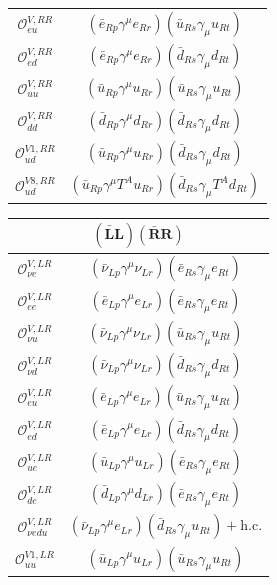 \begin{table}[htbp]
{\begin{tabular}[t]{c|c}
        $\mathcal{O}_{eu}^{V,RR}$ & $(\bar{e}_{Rp} \gamma^\mu e_{Rr})(\bar{u}_{Rs} \gamma_\mu u_{Rt})$ \\
        $\mathcal{O}_{ed}^{V,RR}$ & $(\bar{e}_{Rp} \gamma^\mu e_{Rr})(\bar{d}_{Rs} \gamma_\mu d_{Rt})$ \\
        $\mathcal{O}_{uu}^{V,RR}$ & $(\bar{u}_{Rp} \gamma^\mu u_{Rr})(\bar{u}_{Rs} \gamma_\mu u_{Rt})$ \\
        $\mathcal{O}_{dd}^{V,RR}$ & $(\bar{d}_{Rp} \gamma^\mu d_{Rr})(\bar{d}_{Rs} \gamma_\mu d_{Rt})$ \\
        $\mathcal{O}_{ud}^{V1,RR}$ & $(\bar{u}_{Rp} \gamma^\mu u_{Rr})(\bar{d}_{Rs} \gamma_\mu d_{Rt})$ \\
        $\mathcal{O}_{ud}^{V8,RR}$ & $(\bar{u}_{Rp} \gamma^\mu T^A u_{Rr})(\bar{d}_{Rs} \gamma_\mu T^A d_{Rt})$
    \end{tabular}
    \hspace{0.3em}
    \begin{tabular}[t]{c|c}
        \multicolumn{2}{c}{\textbf{$\boldsymbol{(\bar{L}L)(\bar{R}R)}$}} \\ \hline
        \cellcolor{gray!25}$\mathcal{O}_{\nu e}^{V,LR}$ & \cellcolor{gray!25}$(\bar{\nu}_{Lp} \gamma^\mu \nu_{Lr})(\bar{e}_{Rs} \gamma_\mu e_{Rt})$ \\
        $\mathcal{O}_{ee}^{V,LR}$ & $(\bar{e}_{Lp} \gamma^\mu e_{Lr})(\bar{e}_{Rs} \gamma_\mu e_{Rt})$ \\
        $\mathcal{O}_{\nu u}^{V,LR}$ & $(\bar{\nu}_{Lp} \gamma^\mu \nu_{Lr})(\bar{u}_{Rs} \gamma_\mu u_{Rt})$ \\
        $\mathcal{O}_{\nu d}^{V,LR}$ & $(\bar{\nu}_{Lp} \gamma^\mu \nu_{Lr})(\bar{d}_{Rs} \gamma_\mu d_{Rt})$ \\
        $\mathcal{O}_{eu}^{V,LR}$ & $(\bar{e}_{Lp} \gamma^\mu e_{Lr})(\bar{u}_{Rs} \gamma_\mu u_{Rt})$ \\
        $\mathcal{O}_{ed}^{V,LR}$ & $(\bar{e}_{Lp} \gamma^\mu e_{Lr})(\bar{d}_{Rs} \gamma_\mu d_{Rt})$ \\
        $\mathcal{O}_{ue}^{V,LR}$ & $(\bar{u}_{Lp} \gamma^\mu u_{Lr})(\bar{e}_{Rs} \gamma_\mu e_{Rt})$ \\
        $\mathcal{O}_{de}^{V,LR}$ & $(\bar{d}_{Lp} \gamma^\mu d_{Lr})(\bar{e}_{Rs} \gamma_\mu e_{Rt})$ \\
        $\mathcal{O}_{\nu edu}^{V,LR}$ & $(\bar{\nu}_{Lp} \gamma^\mu e_{Lr})(\bar{d}_{Rs} \gamma_\mu u_{Rt}) + \text{h.c.}$ \\
        $\mathcal{O}_{uu}^{V1,LR}$ & $(\bar{u}_{Lp} \gamma^\mu u_{Lr})(\bar{u}_{Rs} \gamma_\mu u_{Rt})$ \\

\end{tabular}}
\end{table}
